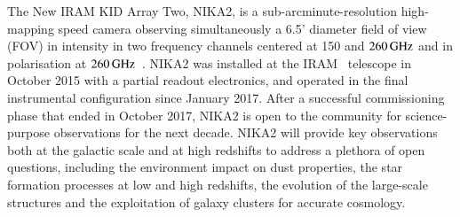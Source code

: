 %
%

The New IRAM KID Array Two, NIKA2, is a sub-arcminute-resolution
high-mapping speed camera observing simultaneously a 6.5' diameter
field of view (FOV) in intensity in two
frequency channels centered at 150 and $260\,\rm{GHz}$ and in
polarisation at $260\, \rm{GHz}$~\citep{Adam2018}. NIKA2 was installed
at the IRAM \trentemetre\ telescope in October 2015 with a partial readout
electronics, and operated in the final instrumental configuration since
January 2017. After a successful
commissioning phase that ended in October 2017, NIKA2 is
open to the community for science-purpose observations for the next
decade. NIKA2 will provide key observations both at the galactic scale
and at high redshifts to address a plethora of open questions, including
the environment impact on dust properties, the star formation processes
at low and high redshifts, the evolution of the large-scale structures
and the exploitation of galaxy clusters for accurate cosmology.
%
%

